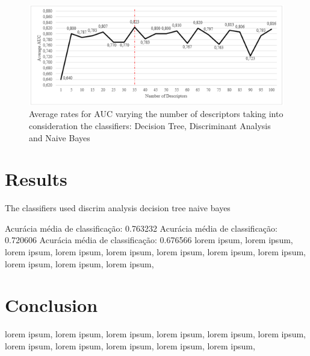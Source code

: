 \documentclass[conference]{IEEEtran}
\begin{document}
\begin{figure}[h]
    \centering
    \includegraphics[width=18.3cm]{images/chart.png}
    \caption{Average rates for AUC varying the number of descriptors taking into consideration the classifiers: Decision Tree, Discriminant Analysis and Naive Bayes}
    \label{fig:my_label}
\end{figure}{}

\section{Results}
	\par The classifiers used 
discrim analysis
decision tree
naive bayes

Acurácia média de classificação: 0.763232
Acurácia média de classificação: 0.720606
Acurácia média de classificação: 0.676566
lorem ipsum, lorem ipsum, lorem ipsum, lorem ipsum, lorem ipsum, lorem ipsum, lorem ipsum, lorem ipsum, lorem ipsum, lorem ipsum, lorem ipsum, 

\section{Conclusion}
lorem ipsum, lorem ipsum, lorem ipsum, lorem ipsum, lorem ipsum, lorem ipsum, lorem ipsum, lorem ipsum, lorem ipsum, lorem ipsum, lorem ipsum, 



\end{document}
